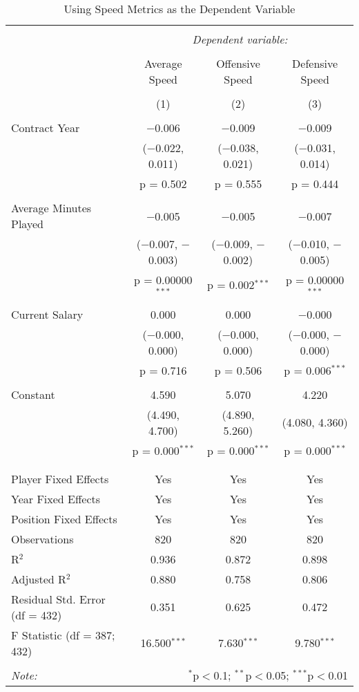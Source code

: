 \documentclass[12pt]{article}
\begin{document}
	\begin{sidewaystable}[!htbp] \centering 
		\caption{Using Speed Metrics as the Dependent Variable} 
		\label{} 
		\begin{tabular}{@{\extracolsep{5pt}}lccc} 
			\\[-1.8ex]\hline 
			\hline \\[-1.8ex] 
			& \multicolumn{3}{c}{\textit{Dependent variable:}} \\ 
			\cline{2-4} 
			\\[-1.8ex] & Average Speed & Offensive Speed & Defensive Speed \\ 
			\\[-1.8ex] & (1) & (2) & (3)\\ 
			\hline \\[-1.8ex] 
			Contract Year & $-$0.006 & $-$0.009 & $-$0.009 \\ 
			& ($-$0.022, 0.011) & ($-$0.038, 0.021) & ($-$0.031, 0.014) \\ 
			& p = 0.502 & p = 0.555 & p = 0.444 \\ 
			& & & \\ 
			Average Minutes Played & $-$0.005 & $-$0.005 & $-$0.007 \\ 
			& ($-$0.007, $-$0.003) & ($-$0.009, $-$0.002) & ($-$0.010, $-$0.005) \\ 
			& p = 0.00000$^{***}$ & p = 0.002$^{***}$ & p = 0.00000$^{***}$ \\ 
			& & & \\ 
			Current Salary & 0.000 & 0.000 & $-$0.000 \\ 
			& ($-$0.000, 0.000) & ($-$0.000, 0.000) & ($-$0.000, $-$0.000) \\ 
			& p = 0.716 & p = 0.506 & p = 0.006$^{***}$ \\ 
			& & & \\ 
			Constant & 4.590 & 5.070 & 4.220 \\ 
			& (4.490, 4.700) & (4.890, 5.260) & (4.080, 4.360) \\ 
			& p = 0.000$^{***}$ & p = 0.000$^{***}$ & p = 0.000$^{***}$ \\ 
			& & & \\ 
			\hline \\[-1.8ex] 
			Player Fixed Effects & Yes & Yes & Yes \\ 
			Year Fixed Effects & Yes & Yes & Yes \\ 
			Position Fixed Effects & Yes & Yes & Yes \\ 
			Observations & 820 & 820 & 820 \\ 
			R$^{2}$ & 0.936 & 0.872 & 0.898 \\ 
			Adjusted R$^{2}$ & 0.880 & 0.758 & 0.806 \\ 
			Residual Std. Error (df = 432) & 0.351 & 0.625 & 0.472 \\ 
			F Statistic (df = 387; 432) & 16.500$^{***}$ & 7.630$^{***}$ & 9.780$^{***}$ \\ 
			\hline 
			\hline \\[-1.8ex] 
			\textit{Note:}  & \multicolumn{3}{r}{$^{*}$p$<$0.1; $^{**}$p$<$0.05; $^{***}$p$<$0.01} \\ 
		\end{tabular} 
	\end{sidewaystable} 
	
\end{document}
